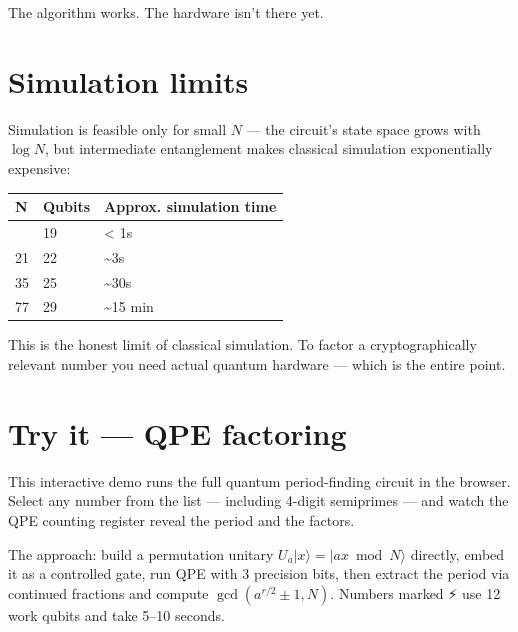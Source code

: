 \documentclass[
  11pt,
  letterpaper,
  oneside]{scrbook}
\begin{document}
The algorithm works. The hardware isn't there yet.

\section{Simulation limits}\label{simulation-limits}

Simulation is feasible only for small \(N\) --- the circuit's state
space grows with \(\log N\), but intermediate entanglement makes
classical simulation exponentially expensive:

\begin{longtable}[]{@{}lll@{}}
\toprule\noalign{}
N & Qubits & Approx. simulation time \\
\midrule\noalign{}
\endhead
\bottomrule\noalign{}
\endlastfoot
15 & 19 & \textless{} 1s \\
21 & 22 & \textasciitilde3s \\
35 & 25 & \textasciitilde30s \\
77 & 29 & \textasciitilde15 min \\
\end{longtable}

This is the honest limit of classical simulation. To factor a
cryptographically relevant number you need actual quantum hardware ---
which is the entire point.

\section{Try it --- QPE factoring}\label{try-it-qpe-factoring}

This interactive demo runs the full quantum period-finding circuit in
the browser. Select any number from the list --- including 4-digit
semiprimes --- and watch the QPE counting register reveal the period and
the factors.

The approach: build a permutation unitary
\(U_a|x\rangle = |ax \bmod N\rangle\) directly, embed it as a controlled
gate, run QPE with 3 precision bits, then extract the period via
continued fractions and compute \(\gcd(a^{r/2} \pm 1, N)\). Numbers
marked ⚡ use 12 work qubits and take 5--10 seconds.
\end{document}

